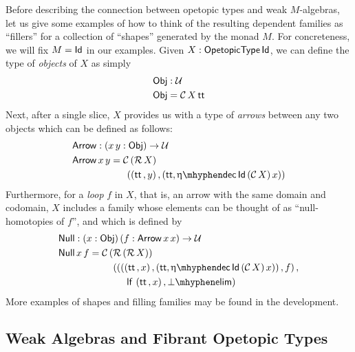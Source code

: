 Before describing the connection between opetopic types and weak
$M$-algebras, let us give some examples of how to think of the
resulting dependent families as ``fillers'' for a collection of
``shapes'' generated by the monad $M$.  For concreteness, we will fix
$M = \mathsf{Id}$ in our examples.  Given $X : \mathsf{OpetopicType}\, \mathsf{Id}$, we can define the
type of \emph{objects} of $X$ as simply
\begin{equation}
  \label{eq:obj-defn}
  \begin{aligned}
    &\mathsf{Obj} : \mathcal{U} \\
    &\mathsf{Obj} = \mathcal{C}\, X\, \mathsf{tt}
  \end{aligned}
\end{equation}
Next, after a single slice, $X$ provides us with a type of
\emph{arrows} between any two objects which can be defined as follows:
\begin{equation}
  \label{eq:arrow-defn}
  \begin{aligned}
    &\mathsf{Arrow} : (x\, y : \mathsf{Obj}) \to \UU \\
    &\mathsf{Arrow}\, x\, y = \Car (\Rel X)\, \\
    &\hspace{2cm} ((\ttt \,, y) \,, (\ttt , \etadec \Id\, (\Car X)\, x))
  \end{aligned}
\end{equation}
Furthermore, for a \emph{loop} $f$ in $X$, that is, an arrow with the
same domain and codomain, $X$ includes a family whose elements can be
thought of as ``null-homotopies of $f$'', and which is defined by
\begin{align*}
  &\mathsf{Null} : (x : \mathsf{Obj})\, (f : \mathsf{Arrow}\, x\, x) \to \UU \\
  &\mathsf{Null}\, x\, f = \Car (\Rel (\Rel X)) \\
  & \hspace{2cm} ((((\ttt \,, x) \,, (\ttt , \etadec \Id\, (\Car X)\, x)) \,, f) \,, \\
  & \hspace{2.5cm} \lf\, (\ttt \,, x) \,, \bot\mhyphen\mathsf{elim})
\end{align*}
More examples of shapes and filling families may be found in the
development.

\subsection{Weak Algebras and Fibrant Opetopic Types}
\label{sec:weak-alg}

